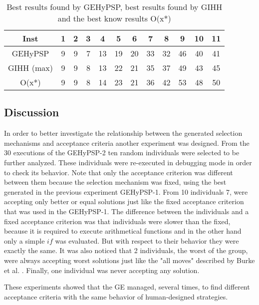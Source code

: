 	\begin{table}[]
		\centering
		\caption{Best results found by GEHyPSP, best results found by GIHH and the best know results O(x*)}
		\label{tab:gihhandbhlh}
		\begin{tabular}{cccccccccccc}
			Inst         & 1 & 2 & 3 & 4  & 5  & 6  & 7  & 8  & 9  & 10 & 11 \\ \hline
			GEHyPSP  & 9 & 9 & 7 & 13 & 19 & 20 & 33 & 32 & 46 & 40 & 41 \\ \hline
			GIHH (max)   & 9 & 9 & 8 & 13 & 22 & 21 & 35 & 37 & 49 & 43 & 45 \\ \hline
			O(x*)        & 9 & 9 & 8 & 14 & 23 & 21 & 36 & 42 & 53 & 48 & 50
		\end{tabular}
	\end{table}
	
	
	\subsection{Discussion}
	
	In order to better investigate the relationship between the generated selection mechanisms and acceptance criteria another experiment was designed. From the 30 executions of the GEHyPSP-2 ten random individuals were selected to be further analyzed. These individuals were re-executed in debugging mode in order to check its behavior. Note that only the acceptance criterion was different between them because the selection mechanism was fixed, using the best generated in the previous experiment GEHyPSP-1. From 10 individuals 7, were accepting only better or equal solutions just like the fixed acceptance criterion that was used in the GEHyPSP-1. The difference between the individuals and a fixed acceptance criterion was that individuals were slower than the fixed, because it is required to execute arithmetical functions and in the other hand only a simple $if$ was evaluated. But with respect to their behavior they were exactly the same. It was also noticed that 2 individuals, the worst of the group, were always accepting worst solutions just like the "all moves" described by Burke et al. \cite{burke2013hyper}. Finally, one individual was never accepting any solution. 
	
	These experiments showed that the GE managed, several times, to find different acceptance criteria with the same behavior of human-designed strategies. 
	

